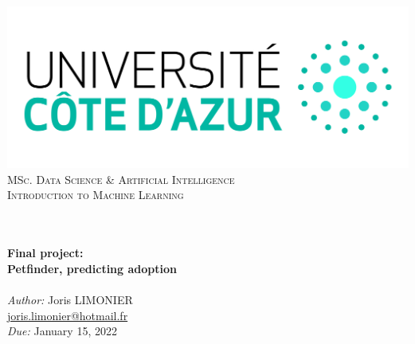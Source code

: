 \begin{titlepage}
	\begin{center}
		\includegraphics[width=\textwidth]{images/logo_uca.jpeg}\\[0.1cm]
		\vspace{1.5cm}
		\textsc{\Large MSc. Data Science \& Artificial Intelligence}\\[1.2cm]
		\textsc{\Large Introduction to Machine Learning}\\[1.2cm]
		\\
		\vspace{1cm}

		\HRule \\[0.5cm]
		{\huge \bfseries Final project:\\[.4cm]
		Petfinder, predicting adoption}\\[0.4cm]
		\HRule \\[1.8cm]
		\large
		\emph{Author:} Joris LIMONIER\\[.2cm]
		\href{mailto:joris.limonier@hotmail.fr}{\color{black}joris.limonier@hotmail.fr} \\[.2cm]
		\emph{Due:} {\large January 15, 2022}
	\end{center}
\end{titlepage}


